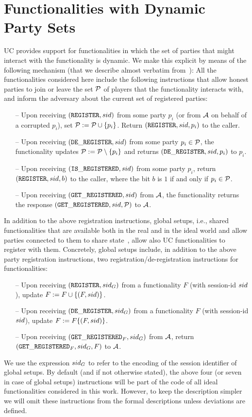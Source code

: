 \section{Functionalities with Dynamic Party Sets}\label{se:registration}
UC provides support for functionalities in which the set of parties that might interact with the functionality is dynamic. We make this explicit by means of the following mechanism (that we describe almost 
verbatim from~\cite[Sec. 3.1]{C:BMTZ17}): All the functionalities considered here include the following instructions that allow honest parties to join or leave the set $\mathcal{P}$ of players that the functionality interacts with, and inform the adversary about the current set of registered parties:
\begin{itemize}
\item[--]  Upon receiving $(\mathtt{REGISTER}, sid)$ from some party $p_i$ (or from $\mathcal{A}$ on behalf of a corrupted $p_i$), set $\mathcal{P} := \mathcal{P} \cup \{p_i\}$. Return $(\mathtt{REGISTER}, sid, p_i)$ to the caller.

\item[--]  Upon receiving $(\mathtt{DE\_REGISTER},sid)$ from some party $p_i\in\mathcal{P}$, the functionality updates 
$\mathcal{P} :=\mathcal{P} \setminus \{p_i\}$ and returns $(\mathtt{DE\_REGISTER}, sid, p_i)$ to $p_i$.
\item[--] Upon receiving $(\mathtt{IS\_REGISTERED}, sid)$ from some party $p_i$, return $(\mathtt{REGISTER}, sid, b)$ to the caller, where the bit $b$ is $1$ if and only if $p_i\in\mathcal{P}$.
\item[--] Upon receiving $(\mathtt{GET\_REGISTERED},sid)$ from $\mathcal{A}$, the functionality returns the response 
$(\mathtt{GET\_REGISTERED}, \allowbreak sid, \mathcal{P})$ to $\mathcal{A}$.
\end{itemize}

In addition to the above registration instructions, global setups, i.e., shared functionalities that are available both in the real and in the ideal world and allow parties connected to them to share state~\cite{TCC:CDPW07}, allow also UC functionalities to register with them. Concretely, global setups include, in addition to
 the above party registration instructions, two registration/de-registration instructions for functionalities:

\begin{itemize}
\item[--] Upon receiving $(\mathtt{REGISTER}, sid_G)$ from a functionality $F$ (with session-id $sid$), update $F:= F \cup \{(F, sid)\}$.
\item[--] Upon receiving $(\mathtt{DE\_REGISTER},sid_G)$ from a functionality $F$ (with session-id $sid$), update $F := F \{(F, sid)\}$.
\item[--] Upon receiving $(\mathtt{GET\_REGISTERED}_F, sid_G)$ from $\mathcal{A}$, return $(\mathtt{GET\_REGISTERED}_F, sid_G, F)$ to $\mathcal{A}$.

\end{itemize}
We use the expression $sid_G$ to refer to the encoding of the session identifier of global setups. By default (and if not otherwise stated), the above four (or seven in case of global setups) instructions will be part of the code of all ideal functionalities considered in this work. However, to keep the description simpler we will omit these instructions from the formal descriptions unless deviations are defined.
